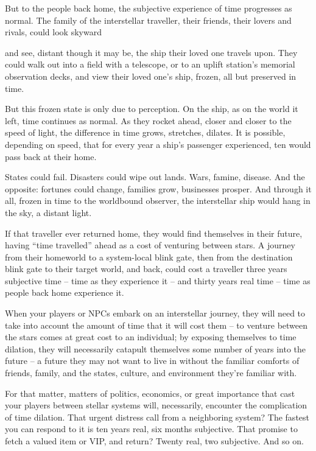 But to the people back home, the subjective experience of time progresses as normal. The  
family of the interstellar traveller, their friends, their lovers and rivals, could look skyward  

                                                                                                           


and see, distant though it may be, the ship their loved one travels upon. They could walk  
out into a field with a telescope, or to an uplift station’s memorial observation decks, and  
view their loved one’s ship, frozen, all but preserved in time.   

But this frozen state is only due to perception. On the ship, as on the world it left, time  
continues as normal. As they rocket ahead, closer and closer to the speed of light, the  
difference in time grows, stretches, dilates. It is possible, depending on speed, that for  
every year a ship’s passenger experienced, ten would pass back at their home.     

States could fail. Disasters could wipe out lands. Wars, famine, disease. And the opposite:  
fortunes could change, families grow, businesses prosper. And through it all, frozen in time  
to the worldbound observer, the interstellar ship would hang in the sky, a distant light.   

If that traveller ever returned home, they would find themselves in their future, having “time  
travelled” ahead as a cost of venturing between stars. A journey from their homeworld to a  
system-local blink gate, then from the destination blink gate to their target world, and back,  
could cost a traveller three years subjective time -- time as they experience it -- and thirty  
years real time -- time as people back home experience it.   

When your players or NPCs embark on an interstellar journey, they will need to take into account  
the amount of time that it will cost them -- to venture between the stars comes at great cost to an  
individual; by exposing themselves to time dilation, they will necessarily catapult themselves some  
number of years into the future -- a future they may not want to live in without the familiar comforts  
of friends, family, and the states, culture, and environment they’re familiar with.   

For that matter, matters of politics, economics, or great importance that cast your players between  
stellar systems will, necessarily, encounter the complication of time dilation. That urgent distress  
call from a neighboring system? The fastest you can respond to it is ten years real, six months  
subjective. That promise to fetch a valued item or VIP, and return? Twenty real, two subjective.  
And so on.   

